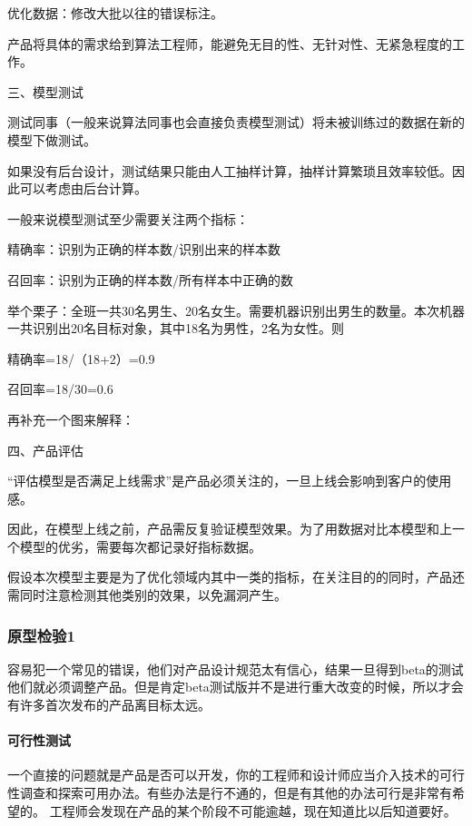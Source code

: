 \documentclass[letterpaper,11pt,english]{sphinxmanual}
\begin{document}
优化数据：修改大批以往的错误标注。

产品将具体的需求给到算法工程师，能避免无目的性、无针对性、无紧急程度的工作。

三、模型测试

测试同事（一般来说算法同事也会直接负责模型测试）将未被训练过的数据在新的模型下做测试。

如果没有后台设计，测试结果只能由人工抽样计算，抽样计算繁琐且效率较低。因此可以考虑由后台计算。

一般来说模型测试至少需要关注两个指标：

精确率：识别为正确的样本数/识别出来的样本数

召回率：识别为正确的样本数/所有样本中正确的数

举个栗子：全班一共30名男生、20名女生。需要机器识别出男生的数量。本次机器一共识别出20名目标对象，其中18名为男性，2名为女性。则

精确率=18/（18+2）=0.9

召回率=18/30=0.6

再补充一个图来解释：

四、产品评估

“评估模型是否满足上线需求”是产品必须关注的，一旦上线会影响到客户的使用感。

因此，在模型上线之前，产品需反复验证模型效果。为了用数据对比本模型和上一个模型的优劣，需要每次都记录好指标数据。

假设本次模型主要是为了优化领域内其中一类的指标，在关注目的的同时，产品还需同时注意检测其他类别的效果，以免漏洞产生。


\subsubsection{原型检验1\sphinxfootnotemark[275]}
\label{\detokenize{chapter_project/inspect:id1}}\label{\detokenize{chapter_project/inspect::doc}}%
\begin{footnotetext}[275]\sphinxAtStartFootnote
{}
%
\end{footnotetext}\ignorespaces 
容易犯一个常见的错误，他们对产品设计规范太有信心，结果一旦得到beta的测试他们就必须调整产品。但是肯定beta测试版并不是进行重大改变的时候，所以才会有许多首次发布的产品离目标太远。


\paragraph{可行性测试}
\label{\detokenize{chapter_project/inspect:id2}}
一个直接的问题就是产品是否可以开发，你的工程师和设计师应当介入技术的可行性调查和探索可用办法。有些办法是行不通的，但是有其他的办法可行是非常有希望的。
工程师会发现在产品的某个阶段不可能逾越，现在知道比以后知道要好。
\end{document}
